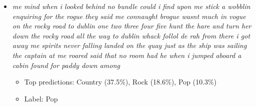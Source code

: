 \documentclass[12pt]{article}
\begin{document}
\begin{itemize}
	\item \textit{me mind when i looked behind no bundle could i find upon me stick a wobblin enquiring for the rogue they said me connaught brogue wasnt much in vogue on the rocky road to dublin one two three four five hunt the hare and turn her down the rocky road all the way to dublin whack follol de rah from there i got away me spirits never falling landed on the quay just as the ship was sailing the captain at me roared said that no room had he when i jumped aboard a cabin found for paddy down among}
	\begin{itemize}
		\item Top  predictions: Country (37.5\%), Rock (18.6\%), Pop (10.3\%)
		\item Label: Pop
	\end{itemize}
\end{itemize}


\newpage



\end{document}
